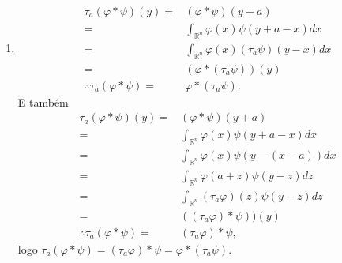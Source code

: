 \documentclass{article}
\begin{document}
\begin{enumerate}
\begin{enumerate}
\begin{enumerate}
					\end{enumerate}
				\item 
				$$
				\begin{aligned}
				\tau_{a}(\varphi*\psi)(y)= & (\varphi*\psi)(y+a) 
				\\
				= & \int_{\mathbb{R}^{n}}\varphi(x)\psi(y+a-x)dx
				\\
				= & \int_{\mathbb{R}^{n}}\varphi(x)(\tau_{a}\psi)(y-x)dx
				\\
				= & (\varphi*(\tau_{a}\psi))(y)
				\\
				\therefore \tau_{a}(\varphi*\psi) = & \varphi*(\tau_{a}\psi).
				\end{aligned}
				$$
				E também
				$$
				\begin{aligned}
				\tau_{a}(\varphi*\psi)(y)= & (\varphi*\psi)(y+a) 
				\\
				= & \int_{\mathbb{R}^{n}}\varphi(x)\psi(y+a-x)dx
				\\
				= & \int_{\mathbb{R}^{n}}\varphi(x)\psi(y-(x-a))dx
				\\
				= & \int_{\mathbb{R}^{n}}\varphi(a+z)\psi(y-z)dz
				\\
				= & \int_{\mathbb{R}^{n}} (\tau_{a}\varphi)(z)\psi(y-z)dz
				\\
				= & ((\tau_{a}\varphi)*\psi))(y)
				\\
				\therefore \tau_{a}(\varphi*\psi) = & (\tau_{a}\varphi)*\psi,
				\end{aligned}
				$$
				logo $\tau_{a}(\varphi*\psi) = (\tau_{a}\varphi)*\psi = \varphi*(\tau_{a}\psi)$.
				

\end{enumerate}
\end{enumerate}
\end{document}

